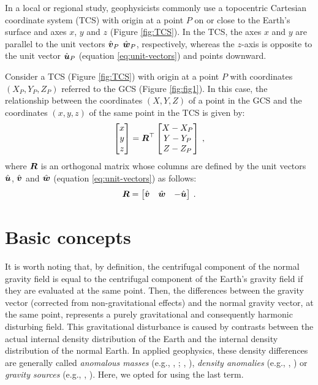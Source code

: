 \documentclass[extra]{gji}
\begin{document}
In a local or regional study, geophysicists commonly use a topocentric 
Cartesian coordinate system (TCS) with origin at a point $P$ on or 
close to the Earth's surface and axes $x$, $y$ and $z$ (Figure 
\ref{fig:TCS}). In the TCS, the axes $x$ and $y$ are parallel to 
the unit vectors $\hat{\mitbf{v}}_{P}$ $\hat{\mitbf{w}}_{P}$, respectively,
whereas the $z$-axis is opposite to the unit vector 
$\hat{\mitbf{u}}_{P}$ (equation \ref{eq:unit-vectors}) and points downward.

Consider a TCS (Figure \ref{fig:TCS}) with origin at a point $P$ with
coordinates $(X_{P}, Y_{P}, Z_{P})$ referred to the GCS (Figure \ref{fig:fig1}).
In this case, the relationship between the coordinates $(X, Y, Z)$ of a 
point in the GCS and the coordinates $(x, y, z)$ of the same point in the 
TCS is given by:
\begin{equation}
\begin{bmatrix}
x \\
y \\
z 
\end{bmatrix} =
\mitbf{R}^{\top} \begin{bmatrix}
X - X_{P} \\
Y - Y_{P} \\
Z - Z_{P}
\end{bmatrix} \: ,
\label{eq:GCS2TCS}
\end{equation}
where $\mitbf{R}$ is an orthogonal matrix whose columns
are defined by the unit vectors $\hat{\mitbf{u}}$, $\hat{\mitbf{v}}$ and
$\hat{\mitbf{w}}$ (equation \ref{eq:unit-vectors}) as follows:
\begin{equation}
\mitbf{R} = 
\begin{bmatrix}
\hat{\mitbf{v}} & \hat{\mitbf{w}} & -\hat{\mitbf{u}}
\end{bmatrix} \: .
\label{eq:R}
\end{equation}

\section{Basic concepts}

It is worth noting that, by definition, 
the centrifugal component of the normal gravity field is
equal to the centrifugal component of the Earth's gravity
field if they are evaluated at the same point.
Then, the differences between the gravity vector
(corrected from non-gravitational effects) 
and the normal gravity vector, at the same point, represents a purely 
gravitational and consequently harmonic disturbing field.
This gravitational disturbance 
is caused by contrasts between the actual internal 
density distribution of the Earth and the internal density 
distribution of the normal Earth.
In applied geophysics, these density differences are generally 
called \textit{anomalous masses} (e.g., \citeauthor{hammer1945}, 
\citeyear{hammer1945}; \citeauthor{lafehr1965}, \citeyear{lafehr1965}),
\textit{density anomalies} (e.g., \citeauthor{forsberg1984}, \citeyear{forsberg1984})
or \textit{gravity sources} (e.g., \citeauthor{blakely1996}, 
\citeyear{blakely1996}). Here, we opted for using the last term.
\end{document}
